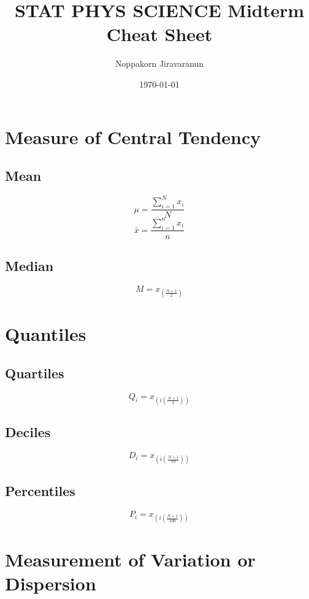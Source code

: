 \documentclass[twocolumn]{article}
\title{STAT PHYS SCIENCE Midterm Cheat Sheet}
\author{Noppakorn Jiravaranun}
\date{\today}
\begin{document}
\maketitle
\section{Measure of Central Tendency}
\subsection{Mean}
\begin{equation}
    \mu = \frac{\sum_{i=1}^{N}x_{i}}{N}
\end{equation}
\begin{equation}
    \bar{x} = \frac{\sum_{i=1}^{n}x_{i}}{n}
\end{equation}
\subsection{Median}
\begin{equation}
    M = x_{(\frac{N+1}{2})}
\end{equation}
\section{Quantiles}
\subsection{Quartiles}
\begin{equation}
    Q_{i} = x_{(i(\frac{N+1}{4}))}
\end{equation}
\subsection{Deciles}
\begin{equation}
    D_{i} = x_{(i(\frac{N+1}{10}))}
\end{equation}
\subsection{Percentiles}
\begin{equation}
    P_{i} = x_{(i(\frac{N+1}{100}))}
\end{equation}

\newpage

\section{Measurement of Variation or Dispersion}
\end{document}
